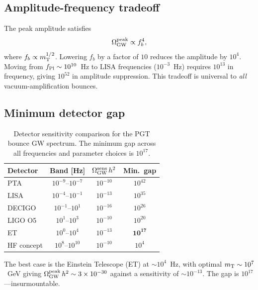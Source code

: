 \documentclass[aps,prd,twocolumn,superscriptaddress,showpacs,preprintnumbers,
  nofootinbib,longbibliography,floatfix]{revtex4-2}
\newcommand{\OmGW}{\Omega_{\rm GW}}
\newcommand{\mT}{m_{\rm T}}
\begin{document}
\subsection{Amplitude-frequency tradeoff}

The peak amplitude satisfies
\begin{equation}\label{eq:tradeoff}
  \OmGW^{\rm peak} \propto f_b^4,
\end{equation}
where $f_b \propto \mT^{1/2}$. Lowering $f_b$ by a factor of $10$
reduces the amplitude by $10^4$. Moving from $f_{\rm Pl} \sim 10^{10}$~Hz
to LISA frequencies ($10^{-3}$~Hz) requires $10^{13}$ in frequency,
giving $10^{52}$ in amplitude suppression. This tradeoff is universal to
\textit{all} vacuum-amplification bounces.

\subsection{Minimum detector gap}

\begin{table}[t]
\centering
\caption{\label{tab:detector} Detector sensitivity comparison for the
PGT bounce GW spectrum. The minimum gap across all frequencies and
parameter choices is $10^{17}$.}
\begin{ruledtabular}
\begin{tabular}{lccc}
\textbf{Detector} & \textbf{Band [Hz]} &
  $\OmGW^{\rm sens}\,h^2$ & \textbf{Min.\ gap} \\
\hline
PTA & $10^{-9}$--$10^{-7}$ & $10^{-10}$ & $10^{42}$ \\
LISA & $10^{-4}$--$10^{-1}$ & $10^{-13}$ & $10^{35}$ \\
DECIGO & $10^{-1}$--$10^{1}$ & $10^{-16}$ & $10^{26}$ \\
LIGO O5 & $10^{1}$--$10^{3}$ & $10^{-10}$ & $10^{20}$ \\
ET & $10^{0}$--$10^{4}$ & $10^{-13}$ & $\mathbf{10^{17}}$ \\
HF concept & $10^{8}$--$10^{10}$ & $10^{-10}$ & $10^{4}$ \\
\end{tabular}
\end{ruledtabular}
\end{table}

The best case is the Einstein Telescope (ET) at $\sim\!10^4$~Hz, with
optimal $\mT \sim 10^7$~GeV giving $\OmGW^{\rm peak}\,h^2 \sim 3\times
10^{-30}$ against a sensitivity of $\sim\!10^{-13}$. The gap is
$10^{17}$---insurmountable.
\end{document}
